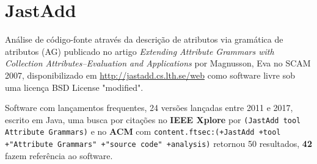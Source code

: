 \section{JastAdd}

Análise de código-fonte através da descrição de atributos via gramática de atributos (AG)
publicado no artigo {\it Extending Attribute Grammars with Collection Attributes--Evaluation and Applications}
por Magnusson, Eva
no SCAM 2007,
disponibilizado em \url{http://jastadd.cs.lth.se/web}
como software livre
sob uma licença BSD License "modified".

Software com lançamentos frequentes,
24 versões lançadas
entre 2011 e 2017,
escrito em Java,
uma busca por citações no {\bf IEEE Xplore} por
\texttt{(JastAdd tool Attribute Grammars)}
e no {\bf ACM} com
\texttt{content.ftsec:(+JastAdd +tool +"Attribute Grammars" +"source code" +analysis)}
retornou
50 resultados,
{\bf 42} fazem referência ao software.


